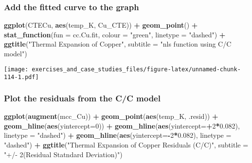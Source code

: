 \documentclass[]{book}
\newenvironment{Shaded}{\begin{snugshade}}{\end{snugshade}}
\newcommand{\DataTypeTok}[1]{\textcolor[rgb]{0.13,0.29,0.53}{#1}}
\newcommand{\DecValTok}[1]{\textcolor[rgb]{0.00,0.00,0.81}{#1}}
\newcommand{\FloatTok}[1]{\textcolor[rgb]{0.00,0.00,0.81}{#1}}
\newcommand{\KeywordTok}[1]{\textcolor[rgb]{0.13,0.29,0.53}{\textbf{#1}}}
\newcommand{\NormalTok}[1]{#1}
\newcommand{\OperatorTok}[1]{\textcolor[rgb]{0.81,0.36,0.00}{\textbf{#1}}}
\newcommand{\StringTok}[1]{\textcolor[rgb]{0.31,0.60,0.02}{#1}}
\theoremstyle{definition}
\theoremstyle{definition}
\theoremstyle{definition}
\theoremstyle{remark}
\begin{document}
\hypertarget{add-the-fitted-curve-to-the-graph-1}{%
\subsubsection{Add the fitted curve to the
graph}\label{add-the-fitted-curve-to-the-graph-1}}

\begin{Shaded}
\begin{Highlighting}[]
\KeywordTok{ggplot}\NormalTok{(CTECu, }\KeywordTok{aes}\NormalTok{(temp_K, Cu_CTE)) }\OperatorTok{+}
\StringTok{  }\KeywordTok{geom_point}\NormalTok{() }\OperatorTok{+}\StringTok{ }
\StringTok{  }\KeywordTok{stat_function}\NormalTok{(}\DataTypeTok{fun =}\NormalTok{ cc.Cu.fit, }\DataTypeTok{colour =} \StringTok{"green"}\NormalTok{, }\DataTypeTok{linetype =} \StringTok{"dashed"}\NormalTok{) }\OperatorTok{+}
\StringTok{  }\KeywordTok{ggtitle}\NormalTok{(}\StringTok{"Thermal Expansion of Copper"}\NormalTok{, }\DataTypeTok{subtitle =} \StringTok{"nls function using C/C model"}\NormalTok{)}
\end{Highlighting}
\end{Shaded}

\texttt{[image: exercises\_and\_case\_studies\_files/figure-latex/unnamed-chunk-114-1.pdf]}

\hypertarget{plot-the-residuals-from-the-cc-model}{%
\subsubsection{Plot the residuals from the C/C
model}\label{plot-the-residuals-from-the-cc-model}}

\begin{Shaded}
\begin{Highlighting}[]
\KeywordTok{ggplot}\NormalTok{(}\KeywordTok{augment}\NormalTok{(mcc_Cu)) }\OperatorTok{+}
\StringTok{  }\KeywordTok{geom_point}\NormalTok{(}\KeywordTok{aes}\NormalTok{(temp_K, .resid)) }\OperatorTok{+}
\StringTok{  }\KeywordTok{geom_hline}\NormalTok{(}\KeywordTok{aes}\NormalTok{(}\DataTypeTok{yintercept=}\DecValTok{0}\NormalTok{)) }\OperatorTok{+}
\StringTok{  }\KeywordTok{geom_hline}\NormalTok{(}\KeywordTok{aes}\NormalTok{(}\DataTypeTok{yintercept=}\OperatorTok{+}\DecValTok{2}\OperatorTok{*}\FloatTok{0.082}\NormalTok{), }\DataTypeTok{linetype =} \StringTok{"dashed"}\NormalTok{) }\OperatorTok{+}
\StringTok{  }\KeywordTok{geom_hline}\NormalTok{(}\KeywordTok{aes}\NormalTok{(}\DataTypeTok{yintercept=}\OperatorTok{-}\DecValTok{2}\OperatorTok{*}\FloatTok{0.082}\NormalTok{), }\DataTypeTok{linetype =} \StringTok{"dashed"}\NormalTok{) }\OperatorTok{+}
\StringTok{  }\KeywordTok{ggtitle}\NormalTok{(}\StringTok{"Thermal Expansion of Copper Residuals (C/C)"}\NormalTok{, }\DataTypeTok{subtitle =} \StringTok{"+/- 2(Residual Statndard Deviation)"}\NormalTok{)}
\end{Highlighting}
\end{Shaded}
\end{document}
